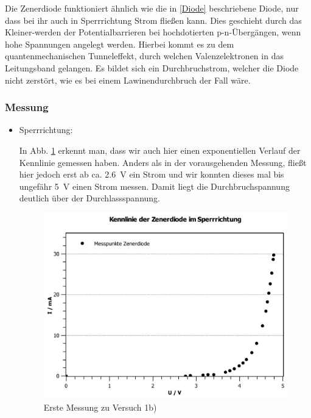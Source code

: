 \documentclass[11pt,a4paper,titlepage, ngerman]{article}
\begin{document}
			Die Zenerdiode funktioniert ähnlich wie die in \ref{Diode} beschriebene Diode, nur dass bei ihr auch in Sperrrichtung Strom fließen kann.
			Dies geschieht durch das Kleiner-werden der Potentialbarrieren bei hochdotierten p-n-Übergängen, wenn hohe Spannungen angelegt werden.
			Hierbei kommt es zu dem quantenmechanischen Tunneleffekt, durch welchen Valenzelektronen in das Leitungsband gelangen.
			Es bildet sich ein Durchbruchstrom, welcher die Diode nicht zerstört, wie es bei einem Lawinendurchbruch der Fall wäre.
			
			\subsubsection*{Messung}
			
				 \begin{itemize}
				 	
				 	\item Sperrrichtung: 
				 	
				 	In Abb. \ref{KL b1} erkennt man, dass wir auch hier einen exponentiellen Verlauf der Kennlinie gemessen haben. 				 	
				 	Anders als in der vorausgehenden Messung, fließt hier jedoch erst ab ca. \SI{2.6}{\V} ein Strom und wir konnten dieses mal bis ungefähr \SI{5}{\V} einen Strom messen.
				 	Damit liegt die Durchbruchspannung deutlich über der Durchlassspannung.
				 	
				 	\begin{figure}
				 		\centering
				 		\includegraphics[width=\textwidth]{KennlinieZenerdiodeSperrrichtung.pdf}
				 		\caption{Erste Messung zu Versuch 1b)}
				 		\label{KL b1}
				 	\end{figure}
				 	

\end{itemize}
\end{document}
